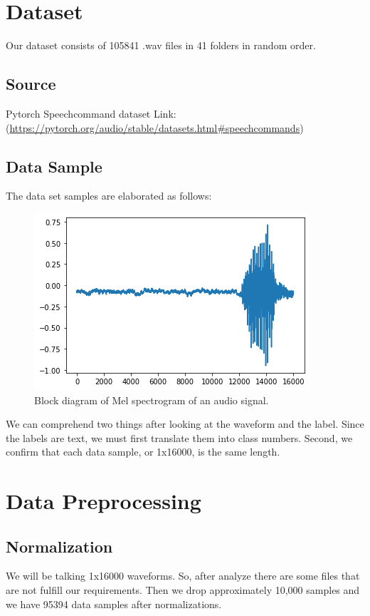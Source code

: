 \section{Dataset }
Our dataset consists of 105841 .wav files in 41 folders in random order. 

\subsection{Source }
Pytorch Speechcommand dataset Link: \\
(\url {https://pytorch.org/audio/stable/datasets.html#speechcommands})
\subsection{Data Sample  }
The data set samples are elaborated as follows:
    \begin{figure}[ht]
            \centering
            \includegraphics[scale=1]{images/figure4.png}
            \caption{Block diagram of Mel spectrogram of an audio signal.}
            \label{fig: Block diagram of Mel spectrogram of an audio signal}
            \end{figure}
We can comprehend two things after looking at the waveform and the label. Since the labels are text, we must first translate them into class numbers. Second, we confirm that each data sample, or 1x16000, is the same length.            
\section{Data Preprocessing }
\subsection{Normalization}
We will be talking 1x16000 waveforms.  So, after analyze there are some files that are not fulfill our requirements. Then we drop approximately 10,000 samples and we have 95394 data samples after normalizations.